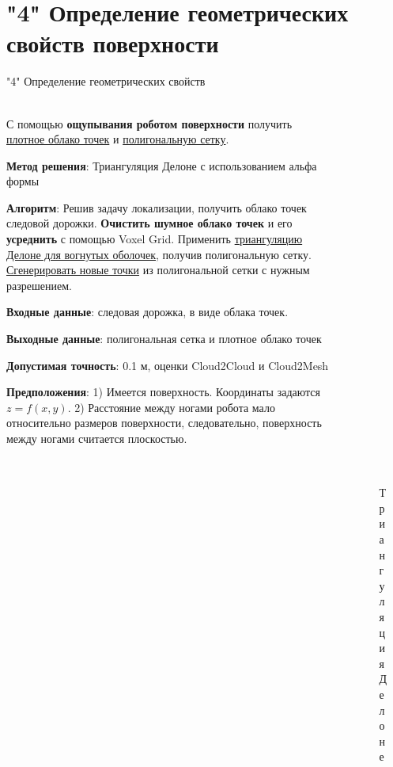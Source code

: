 \section{"4" Определение геометрических свойств поверхности}

\begin{frame}[t]{"4" Определение геометрических свойств}
\framesubtitle{}
    \begin{columns}[T,onlytextwidth]
        \begin{column}{0.69\textwidth}
            \small
            С помощью \textbf{ощупывания роботом поверхности} получить \underline{плотное облако точек} и \underline{полигональную сетку}.

            \textbf{Метод решения}: Триангуляция Делоне с использованием альфа формы

            \textbf{Алгоритм}: Решив задачу локализации, получить облако точек следовой дорожки. \textbf{Очистить шумное облако точек} и его \textbf{усреднить} с помощью Voxel Grid. Применить \underline{триангуляцию Делоне для вогнутых оболочек}, получив полигональную сетку. \underline{Сгенерировать новые точки} из полигональной сетки с нужным разрешением.

            \textbf{Входные данные}: следовая дорожка, в виде облака точек.
            
            \textbf{Выходные данные}: полигональная сетка и плотное облако точек
            
            \textbf{Допустимая точность}: 0.1 м, оценки Cloud2Cloud и Cloud2Mesh

            \textbf{Предположения}: 1) Имеется поверхность. Координаты задаются $z=f(x,y)$. 2) Расстояние между ногами робота мало относительно размеров поверхности, следовательно, поверхность между ногами считается плоскостью.   
        \end{column}
        \begin{column}{0.29\textwidth}
            \begin{figure}[H]
                \begin{subfigure}{0.99\textwidth}
                    \centering\includegraphics[height=2.5cm,width=1\textwidth,keepaspectratio]{../images/slides/delone_mag.png}
                    \caption*{Триангуляция Делоне}
                \end{subfigure}


\end{figure}
\end{column}
\end{columns}
\end{frame}
